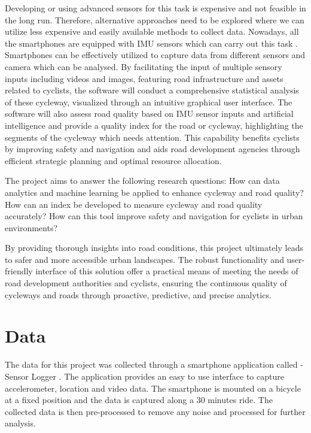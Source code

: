 \documentclass[a4paper,12pt]{Classes/RoboticsLaTeX}
\begin{document}
\begin{abstracts}
Developing or using advanced sensors for this task is expensive and not feasible in the long run. Therefore, alternative approaches need to be explored where we can utilize less expensive and easily available methods to collect data. Nowadays, all the smartphones are equipped with IMU sensors which can carry out this task \cite{Sattar}. Smartphones can be effectively utilized to capture data from different sensors and camera which can be analysed. By facilitating the input of multiple sensory inputs including videos and images, featuring road infrastructure and assets related to cyclists, the software will conduct a comprehensive statistical analysis of these cycleway, visualized through an intuitive graphical user interface. The software will also assess road quality based on IMU sensor inputs and artificial intelligence and provide a quality index for the road or cycleway, highlighting the segments of the cycleway which needs attention. This capability benefits cyclists by improving safety and navigation and aids road development agencies through efficient strategic planning and optimal resource allocation.

The project aims to answer the following research questions: How can data analytics and machine learning be applied to enhance cycleway and road quality? How can an index be developed to measure cycleway and road quality accurately? How can this tool improve safety and navigation for cyclists in urban environments? 

By providing thorough insights into road conditions, this project ultimately leads to safer and more accessible urban landscapes. The robust functionality and user-friendly interface of this solution offer a practical means of meeting the needs of road development authorities and cyclists, ensuring the continuous quality of cycleways and roads through proactive, predictive, and precise analytics.


	\chapter{Data}
	\label{chap:data}
	
	The data for this project was collected through a smartphone application called - Sensor Logger \cite{Sensorlogger}. The application provides an easy to use interface to capture accelerometer, location and video data. The smartphone is mounted on a bicycle at a fixed position and the data is captured along a 30 minutes ride. The collected data is then pre-processed to remove any noise \cite{Sattar} and processed for further analysis.


\end{abstracts}
\end{document}

